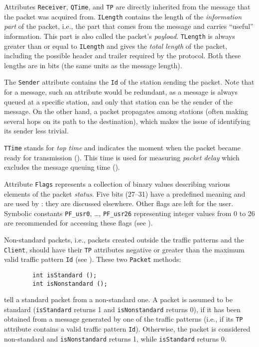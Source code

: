Attributes {\tt Receiver}, {\tt QTime}, and {\tt TP} are directly inherited
from the message that the packet was acquired from.
{\tt ILength} contains the length of the {\em information part\/} of the
packet, i.e., the part that comes from the message and carries ``useful''
information.
This part is also called the packet's {\em payload}.
{\tt TLength} is always greater than or equal to {\tt ILength} and
gives the {\em total length\/} of the packet, including the possible header and
trailer required by the protocol.
Both these lengths are in bits (the same units as the message length).

The {\tt Sender} attribute contains the {\tt Id} of the station sending the
packet.
Note that for a message, such an attribute would be redundant, as a message is
always queued at a specific station, and only that station can be the sender
of the message.
On the other hand, a packet propagates among stations (often
making several hops on its path to the destination), which makes the
issue of identifying its sender less trivial.

{\tt TTime} stands for {\em top time\/} and indicates the moment when the
packet became ready for transmission ().
This time is used for measuring {\em packet delay\/} which excludes the message
queuing time ().

Attribute {\tt Flags} represents a collection of binary values describing
various elements of the packet {\em status}.
Five bits (27--31) have a predefined meaning and are used by \smurph: they are
discussed elsewhere.
Other flags are left for the user.
Symbolic constants {\tt PF\_usr0}, \ldots , {\tt PF\_usr26}
representing integer values from 0 to 26 are recommended for accessing
these flags (see ).

Non-standard packets, i.e.,
packets created outside the traffic patterns and the
{\tt Client}, should have their {\tt TP} attributes negative or greater
than the maximum valid traffic pattern {\tt Id} (see ).
These two {\tt Packet} methods:
\begin{verbatim}
        int isStandard ();
        int isNonstandard ();
\end{verbatim}
tell a standard packet from a non-standard one.
A packet is assumed to be standard ({\tt isStandard} returns 1 and
{\tt isNonstandard} returns 0), if it has
been obtained from a
message generated by one of the traffic patterns (i.e.,
if its {\tt TP} attribute
contains a valid traffic pattern {\tt Id}).
Otherwise, the packet is considered non-standard and {\tt isNonstandard}
returns 1, while {\tt isStandard} returns 0.

